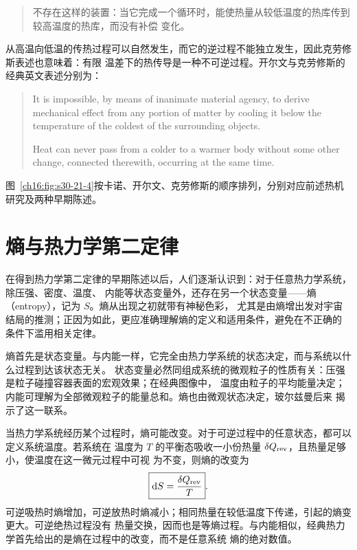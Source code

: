 {\begin{quote}\small
不存在这样的装置：当它完成一个循环时，能使热量从较低温度的热库传到较高温度的热库，而没有补偿
变化。
\end{quote}

从高温向低温的传热过程可以自然发生，而它的逆过程不能独立发生，因此克劳修斯表述也意味着：有限
温差下的热传导是一种不可逆过程。开尔文与克劳修斯的经典英文表述分别为：
\begin{quote}\footnotesize
It is impossible, by means of inanimate material agency, to derive mechanical effect from any portion of
matter by cooling it below the temperature of the coldest of the surrounding objects.

Heat can never pass from a colder to a warmer body without some other change, connected therewith,
occurring at the same time.
\end{quote}

\par\noindent\begin{minipage}{\linewidth}
\foundersPortraitFigure
{}\label{ch16:fig:s30-21-4}
\end{minipage}\par\medskip
图~\ref{ch16:fig:s30-21-4}按卡诺、开尔文、克劳修斯的顺序排列，分别对应前述热机研究及两种早期陈述。

\section{熵与热力学第二定律}

在得到热力学第二定律的早期陈述以后，人们逐渐认识到：对于任意热力学系统，除压强、密度、温度、
内能等状态变量外，还存在另一个状态变量——熵（entropy），记为 $S$。熵从出现之初就带有神秘色彩，
尤其是由熵增出发对宇宙结局的推测；正因为如此，更应准确理解熵的定义和适用条件，避免在不正确的
条件下滥用相关定律。

熵首先是状态变量。与内能一样，它完全由热力学系统的状态决定，而与系统以什么过程到达该状态无关。
状态变量必然同组成系统的微观粒子的性质有关：压强是粒子碰撞容器表面的宏观效果；在经典图像中，
温度由粒子的平均能量决定；内能可理解为全部微观粒子的能量总和。熵也由微观状态决定，玻尔兹曼后来
揭示了这一联系。

当热力学系统经历某个过程时，熵可能改变。对于可逆过程中的任意状态，都可以定义系统温度。若系统在
温度为 $T$ 的平衡态吸收一小份热量 $\delta Q_{\rm rev}$，且热量足够小，使温度在这一微元过程中可视
为不变，则熵的改变为
\begin{equation}
  \boxed{\mathop{}\!\mathrm d S=\frac{\delta Q_{\rm rev}}{T}}.
\end{equation}
可逆吸热时熵增加，可逆放热时熵减小；相同热量在较低温度下传递，引起的熵变更大。可逆绝热过程没有
热量交换，因而也是等熵过程。与内能相似，经典热力学首先给出的是熵在过程中的改变，而不是任意系统
熵的绝对数值。

}
